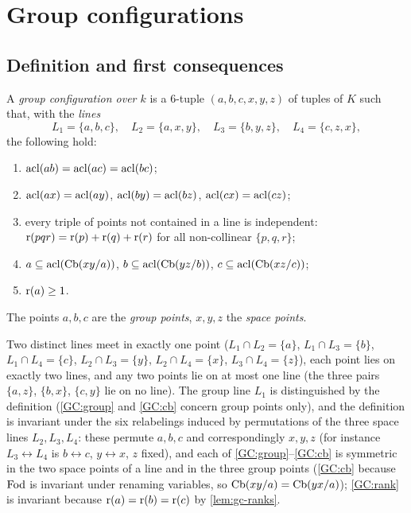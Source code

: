 \section{Group configurations}
\label{sec:gc}

\subsection{Definition and first consequences}

\begin{definition}\label{def:gc}
A \emph{group configuration over $k$} is a $6$-tuple $(a,b,c,x,y,z)$ of tuples of
$K$ such that, with the \emph{lines}
\[
   L_1=\{a,b,c\},\quad L_2=\{a,x,y\},\quad L_3=\{b,y,z\},\quad L_4=\{c,z,x\},
\]
the following hold:
\begin{enumerate}[label=\textup{(GC\arabic*)}]
\item\label{GC:group} $\operatorname{acl}(ab)=\operatorname{acl}(ac)=\operatorname{acl}(bc)$;
\item\label{GC:space} $\operatorname{acl}(ax)=\operatorname{acl}(ay)$, $\operatorname{acl}(by)=\operatorname{acl}(bz)$, $\operatorname{acl}(cx)=\operatorname{acl}(cz)$;
\item\label{GC:indep} every triple of points not contained in a line is independent:
  $\operatorname{r}(pqr)=\operatorname{r}(p)+\operatorname{r}(q)+\operatorname{r}(r)$ for all non-collinear $\{p,q,r\}$;
\item\label{GC:cb} $a\subseteq\operatorname{acl}(\operatorname{Cb}(xy/a))$, $b\subseteq\operatorname{acl}(\operatorname{Cb}(yz/b))$, $c\subseteq\operatorname{acl}(\operatorname{Cb}(xz/c))$;
\item\label{GC:rank} $\operatorname{r}(a)\ge1$.
\end{enumerate}
The points $a,b,c$ are the \emph{group points}, $x,y,z$ the \emph{space points}.
\end{definition}

Two distinct lines meet in exactly one point ($L_1\cap L_2=\{a\}$, $L_1\cap L_3=\{b\}$,
$L_1\cap L_4=\{c\}$, $L_2\cap L_3=\{y\}$, $L_2\cap L_4=\{x\}$, $L_3\cap L_4=\{z\}$), each
point lies on exactly two lines, and any two points lie on at most one line (the three
pairs $\{a,z\}$, $\{b,x\}$, $\{c,y\}$ lie on no line).  The group line $L_1$ is
distinguished by the definition (\ref{GC:group} and \ref{GC:cb} concern group points
only), and the definition is invariant under the six relabelings induced by
permutations of the three space lines $L_2,L_3,L_4$: these permute $a,b,c$ and
correspondingly $x,y,z$ (for instance $L_3\leftrightarrow L_4$ is $b\leftrightarrow c$,
$y\leftrightarrow x$, $z$ fixed), and each of \ref{GC:group}--\ref{GC:cb} is symmetric in
the two space points of a line and in the three group points (\ref{GC:cb} because $\operatorname{Fod}$
is invariant under renaming variables, so $\operatorname{Cb}(xy/a)=\operatorname{Cb}(yx/a)$); \ref{GC:rank} is
invariant because $\operatorname{r}(a)=\operatorname{r}(b)=\operatorname{r}(c)$ by \cref{lem:gc-ranks}.

